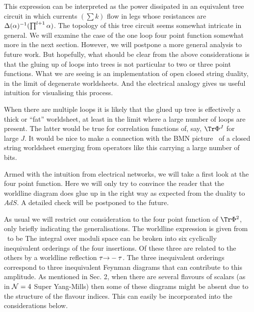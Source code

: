 This expression can be interpreted as the power dissipated in an equivalent tree circuit 
in which currents $(\sum k)$ flow in legs whose resistances are ${\Delta}({\alpha})^{-1}(\prod^{l+1}{\alpha})$. 
The topology of this tree circuit seems somewhat intricate in general. We will examine the 
case of the one loop four point function somewhat more in the next section. However, 
we will postpone a more
general analysis to future work. But hopefully, what should be clear from the above considerations
is that the gluing up of loops into trees is not particular to two or three point functions.
What we are seeing is an implementation of open
closed string duality, in the limit of degenerate worldsheets. 
And the electrical analogy gives us useful intuition for visualising this process.

When there are multiple loops it is likely that the glued up tree is effectively a thick or 
``fat'' worldsheet, at least in the limit where a large number of loops are present. 
The latter would be true for correlation functions of, say, $\Tr \Phi^{J}$ for large $J$. 
It would be nice to make a connection with the BMN picture \bmn\ of a closed string worldsheet 
emerging from operators like this carrying a large number of bits. 



Armed with the intuition from electrical networks, we will take a first look at the 
four point function. Here we will only try to convince the reader that the worldline diagram 
does glue up in the right way as expected from the duality to $AdS$. A detailed check will be 
postponed to the future. 

As usual we will restrict our consideration to the four point function of $\Tr\Phi^2$, only 
briefly indicating the generalisations.
The worldline expression is given from \wlnpt\ to be
\eqn{}
The integral over moduli space can be broken into six
cyclically inequivalent orderings of the four insertions. Of these three are 
related to the others by a worldline reflection ${\tau} {\rightarrow}-{\tau}$. The three inequivalent orderings
correspond to three inequivalent
Feynman diagrams that can contribute to this amplitude. As mentioned in Sec. 2, when there
are several flavours of scalars (as in ${\cal N}=4$ Super Yang-Mills) then some of these diagrams 
might be absent due to the structure of the flavour indices. This can easily be incorporated into
the considerations below.

